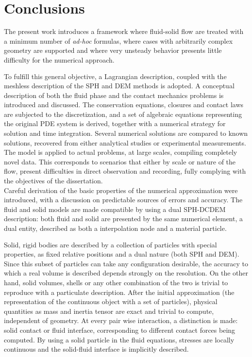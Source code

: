 \label{cap:conclusions}

\section{Conclusions}

The present work introduces a framework where fluid-solid flow are treated with a minimum number of \textit{ad-hoc} formulas, where cases with arbitrarily complex geometry are supported and where very unsteady behavior presents little difficulty for the numerical approach. 

To fulfill this general objective, a Lagrangian description, coupled with the meshless description of the \ac{SPH} and \ac{DEM} methods is adopted. A conceptual description of both the fluid phase and the contact mechanics problems is introduced and discussed. The conservation equations, closures and contact laws are subjected to the discretization, and a set of algebraic equations representing the original \ac{PDE} system is derived, together with a numerical strategy for solution and time integration. Several numerical solutions are compared to known solutions, recovered from either analytical studies or experimental measurements. The model is applied to actual problems, at large scales, compiling completely novel data. This corresponds to scenarios that either by scale or nature of the flow, present difficulties in direct observation and recording, fully complying with the objectives of the dissertation.\\

Careful derivation of the basic properties of the numerical approximation were introduced, with a discussion on predictable sources of errors and accuracy. The fluid and solid models are made compatible by using a dual \ac{SPH}-\ac{DCDEM} description: both fluid and solid are presented by the same numerical element, a dual entity, described as both a interpolation node and a material particle.

Solid, rigid bodies are described by a collection of particles with special properties, as fixed relative positions and a dual nature (both \ac{SPH} and \ac{DEM}). Since this subset of particles can take any configuration desirable, the accuracy to which a real volume is described depends strongly on the resolution. On the other hand, solid volumes, shells or any other combination of the two is trivial to reproduce with a particulate description. After the initial approximation (the representation of the continuous object with a set of particles), physical quantities as mass and inertia tensor are exact and trivial to compute, independent of geometry. At every pair wise interaction, a distinction is made: solid contact or fluid interface, corresponding to different contact forces being computed. By using a solid particle in the fluid equations, stresses are locally continuous and the solid-fluid interface is implicitly described.


